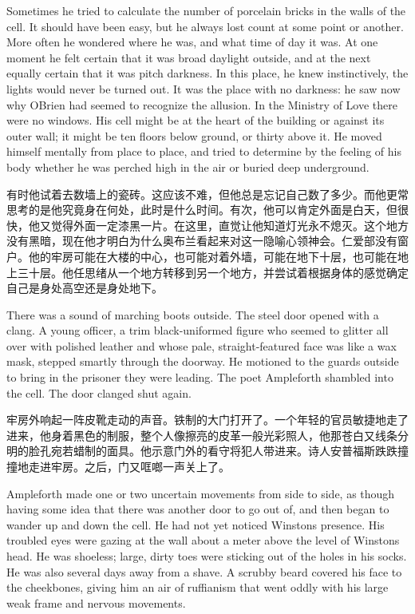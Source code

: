 \begin{paracol}{2}
\switchcolumn*

Sometimes he tried to calculate the number of porcelain bricks in the
walls of the cell. It should have been easy, but he always lost count at
some point or another. More often he wondered where he was, and what
time of day it was. At one moment he felt certain that it was broad
daylight outside, and at the next equally certain that it was pitch
darkness. In this place, he knew instinctively, the lights would never
be turned out. It was the place with no darkness: he saw now why
O\textquotesingle Brien had seemed to recognize the allusion. In the
Ministry of Love there were no windows. His cell might be at the heart
of the building or against its outer wall; it might be ten floors below
ground, or thirty above it. He moved himself mentally from place to
place, and tried to determine by the feeling of his body whether he was
perched high in the air or buried deep underground.

\switchcolumn

有时他试着去数墙上的瓷砖。这应该不难，但他总是忘记自己数了多少。而他更常思考的是他究竟身在何处，此时是什么时间。有次，他可以肯定外面是白天，但很快，他又觉得外面一定漆黑一片。在这里，直觉让他知道灯光永不熄灭。这个地方没有黑暗，现在他才明白为什么奥布兰看起来对这一隐喻心领神会。仁爱部没有窗户。他的牢房可能在大楼的中心，也可能对着外墙，可能在地下十层，也可能在地上三十层。他任思绪从一个地方转移到另一个地方，并尝试着根据身体的感觉确定自己是身处高空还是身处地下。

\switchcolumn*

There was a sound of marching boots outside. The steel door opened with
a clang. A young officer, a trim black-uniformed figure who seemed to
glitter all over with polished leather and whose pale, straight-featured
face was like a wax mask, stepped smartly through the doorway. He
motioned to the guards outside to bring in the prisoner they were
leading. The poet Ampleforth shambled into the cell. The door clanged
shut again.

\switchcolumn

牢房外响起一阵皮靴走动的声音。铁制的大门打开了。一个年轻的官员敏捷地走了进来，他身着黑色的制服，整个人像擦亮的皮革一般光彩照人，他那苍白又线条分明的脸孔宛若蜡制的面具。他示意门外的看守将犯人带进来。诗人安普福斯跌跌撞撞地走进牢房。之后，门又哐啷一声关上了。

\switchcolumn*

Ampleforth made one or two uncertain movements from side to side, as
though having some idea that there was another door to go out of, and
then began to wander up and down the cell. He had not yet noticed
Winston\textquotesingle s presence. His troubled eyes were gazing at the
wall about a meter above the level of Winston\textquotesingle s head. He
was shoeless; large, dirty toes were sticking out of the holes in his
socks. He was also several days away from a shave. A scrubby beard
covered his face to the cheekbones, giving him an air of ruffianism that
went oddly with his large weak frame and nervous movements.


\end{paracol}

